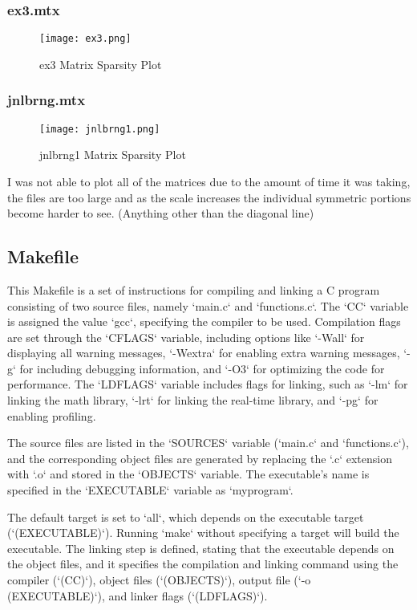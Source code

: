 \documentclass[12pt]{article}
\begin{document}
\subsubsection{ex3.mtx}
\begin{figure}[h!]
    \centering
    \texttt{[image: ex3.png]}
    \caption{ex3 Matrix Sparsity Plot}
    \label{fig:ex3-matrix}
\end{figure}

\subsubsection{jnlbrng.mtx}
\begin{figure}[h!]
    \centering
    \texttt{[image: jnlbrng1.png]}
    \caption{jnlbrng1 Matrix Sparsity Plot}
    \label{fig:jnlbrng1-matrix}
\end{figure}

I was not able to plot all of the matrices due to the amount of time it was taking, the files are too large and as the scale increases the individual symmetric portions become harder to see. (Anything other than the diagonal line)

\subsection{Makefile}
This Makefile is a set of instructions for compiling and linking a C program consisting of two source files, namely `main.c` and `functions.c`. The `CC` variable is assigned the value `gcc`, specifying the compiler to be used. Compilation flags are set through the `CFLAGS` variable, including options like `-Wall` for displaying all warning messages, `-Wextra` for enabling extra warning messages, `-g` for including debugging information, and `-O3` for optimizing the code for performance. The `LDFLAGS` variable includes flags for linking, such as `-lm` for linking the math library, `-lrt` for linking the real-time library, and `-pg` for enabling profiling.

The source files are listed in the `SOURCES` variable (`main.c` and `functions.c`), and the corresponding object files are generated by replacing the `.c` extension with `.o` and stored in the `OBJECTS` variable. The executable's name is specified in the `EXECUTABLE` variable as `myprogram`.

The default target is set to `all`, which depends on the executable target (`(EXECUTABLE)`). Running `make` without specifying a target will build the executable. The linking step is defined, stating that the executable depends on the object files, and it specifies the compilation and linking command using the compiler (`(CC)`), object files (`(OBJECTS)`), output file (`-o (EXECUTABLE)`), and linker flags (`(LDFLAGS)`).
\end{document}
